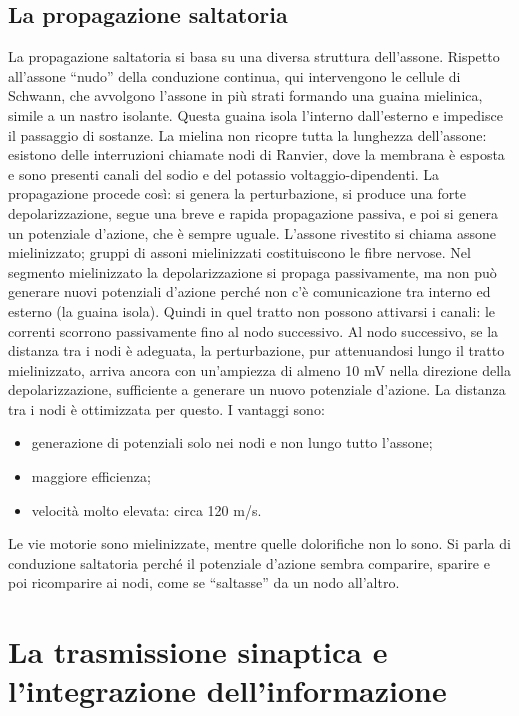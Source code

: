 \documentclass[12pt,a4paper,openany]{book}
\begin{document}
\subsection{La propagazione saltatoria}

La propagazione saltatoria si basa su una diversa struttura dell’assone. Rispetto all’assone “nudo” della conduzione continua, qui intervengono le cellule di Schwann, che avvolgono l’assone in più strati formando una guaina mielinica, simile a un nastro isolante. Questa guaina isola l’interno dall’esterno e impedisce il passaggio di sostanze.
La mielina non ricopre tutta la lunghezza dell’assone: esistono delle interruzioni chiamate nodi di Ranvier, dove la membrana è esposta e sono presenti canali del sodio e del potassio voltaggio-dipendenti.
La propagazione procede così: si genera la perturbazione, si produce una forte depolarizzazione, segue una breve e rapida propagazione passiva, e poi si genera un potenziale d’azione, che è sempre uguale. L’assone rivestito si chiama assone mielinizzato; gruppi di assoni mielinizzati costituiscono le fibre nervose. Nel segmento mielinizzato la depolarizzazione si propaga passivamente, ma non può generare nuovi potenziali d’azione perché non c’è comunicazione tra interno ed esterno (la guaina isola). Quindi in quel tratto non possono attivarsi i canali: le correnti scorrono passivamente fino al nodo successivo.
Al nodo successivo, se la distanza tra i nodi è adeguata, la perturbazione, pur attenuandosi lungo il tratto mielinizzato, arriva ancora con un’ampiezza di almeno 10 mV nella direzione della depolarizzazione, sufficiente a generare un nuovo potenziale d’azione. La distanza tra i nodi è ottimizzata per questo. I vantaggi sono:
\begin{itemize}
    \item generazione di potenziali solo nei nodi e non lungo tutto l’assone;
    \item maggiore efficienza;
    \item velocità molto elevata: circa 120 m/s.
\end{itemize}
Le vie motorie sono mielinizzate, mentre quelle dolorifiche non lo sono.
Si parla di conduzione saltatoria perché il potenziale d’azione sembra comparire, sparire e poi ricomparire ai nodi, come se “saltasse” da un nodo all’altro.

\section{La trasmissione sinaptica e l’integrazione dell’informazione}
\end{document}

